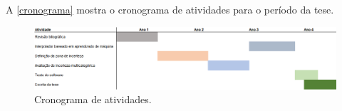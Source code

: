 A \autoref{cronograma} mostra o cronograma de atividades para o período da tese.

\begin{figure}[H]
	\caption{\label{cronograma}Cronograma de atividades.}
	\begin{center}
		\includegraphics[width=\textwidth]{capitulo_3/cronograma_novo.png}
	\end{center}
\end{figure}
